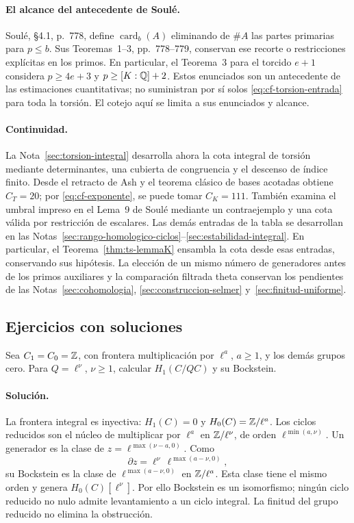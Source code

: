 \paragraph{El alcance del antecedente de Soulé.}
Soulé, §4.1, p.~778, define $\operatorname{card}_b(A)$
eliminando de $\#A$ las partes primarias para $p\le b$.
Sus Teoremas~1--3, pp.~778--779, conservan ese recorte o
restricciones explícitas en los primos. En particular, el
Teorema~3 para el torcido $e+1$ considera
$p\ge4e+3$ y $p\ge[K:\mathbb{Q}]+2$.
Estos enunciados son un antecedente de las estimaciones
cuantitativas; no suministran por sí solos
\eqref{eq:cf-torsion-entrada} para toda la torsión.
El cotejo aquí se limita a sus enunciados y alcance.

\paragraph{Continuidad.}
La Nota~\ref{sec:torsion-integral} desarrolla ahora la cota integral
de torsión mediante determinantes, una cubierta de congruencia
y el descenso de índice finito. Desde el retracto de Ash y
el teorema clásico de bases acotadas obtiene $C_T=20$;
por \eqref{eq:cf-exponente}, se puede tomar $C_K=111$.
También examina el umbral impreso en el Lema~9 de Soulé
mediante un contraejemplo y una cota válida por restricción
de escalares. Las demás entradas de la tabla se desarrollan en las Notas~\ref{sec:rango-homologico-ciclos}--\ref{sec:estabilidad-integral}. En particular, el Teorema~\ref{thm:ts-lemmaK} ensambla la cota desde esas entradas, conservando sus hipótesis.
La elección de un mismo número de generadores antes de los
primos auxiliares y la comparación filtrada theta conservan
los pendientes de las Notas~\ref{sec:cohomologia},
\ref{sec:construccion-selmer} y~\ref{sec:finitud-uniforme}.

\subsection{Ejercicios con soluciones}

\begin{ejercicio}
Sea $C_1=C_0=\mathbb{Z}$, con frontera multiplicación por $\ell^a$,
$a\ge1$, y los demás grupos cero. Para $Q=\ell^\nu$, $\nu\ge1$,
calcular $H_1(C/QC)$ y su Bockstein.
\end{ejercicio}

\paragraph{Solución.}
La frontera integral es inyectiva: $H_1(C)=0$ y
$H_0(C)=\mathbb{Z}/\ell^a$.
Los ciclos reducidos son el núcleo de multiplicar por
$\ell^a$ en $\mathbb{Z}/\ell^\nu$, de orden
$\ell^{\min(a,\nu)}$. Un generador es la clase de
$z=\ell^{\max(\nu-a,0)}$.
Como
\[
 \partial z
 =\ell^\nu\,\ell^{\max(a-\nu,0)},
\]
su Bockstein es la clase de $\ell^{\max(a-\nu,0)}$
en $\mathbb{Z}/\ell^a$. Esta clase tiene el mismo orden y genera
$H_0(C)[\ell^\nu]$.
Por ello Bockstein es un isomorfismo; ningún ciclo reducido
no nulo admite levantamiento a un ciclo integral.
La finitud del grupo reducido no elimina la obstrucción.

